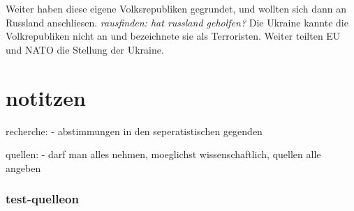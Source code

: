 \documentclass{article}
\begin{document}
Weiter haben diese eigene Volksrepubliken gegrundet, und wollten sich dann an
Russland anschliesen. \textit{rausfinden: hat russland geholfen?}
Die Ukraine kannte die Volkrepubliken nicht an und bezeichnete sie als Terroristen.
Weiter teilten EU und NATO die Stellung der Ukraine.







\section{notitzen}
recherche:
- abstimmungen in den seperatistischen gegenden


quellen:
- darf man alles nehmen, moeglichst wissenschaftlich, quellen alle angeben
\subsubsection{test-quelleon}
~\cite{was-ist-geschehen}
~\cite{what-could-come-next}
~\cite{open-source-intelligence}
~\cite{putins-war}
~\cite{avoiding-a-long-war}
~\cite{how-big-is-the-storm}
~\cite{why-did-putin}



\clearpage
\printbibliography
\end{document}
